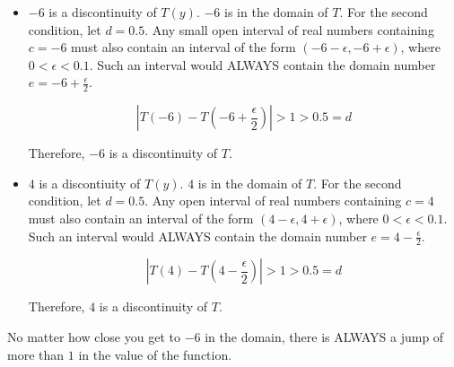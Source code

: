 \documentclass{ximera}
\begin{document}
\begin{example}
\begin{itemize}
\item $-6$ is a discontinuity of $T(y)$.  $-6$ is in the domain of $T$.  For the second condition, let $d = 0.5$. Any small open interval of real numbers containing $c = -6$ must also contain an interval of the form $(-6-\epsilon, -6+\epsilon)$, where $0 < \epsilon < 0.1$.   Such an interval would ALWAYS contain the domain number $e = -6+\frac{\epsilon}{2}$.

\[ \left| T(-6) - T\left(-6+\frac{\epsilon}{2}\right) \right| > 1 > 0.5 = d \]

Therefore, $-6$ is a discontinuity of $T$. \\


\item $4$ is a discontiuity of $T(y)$.   $4$ is in the domain of $T$.  For the second condition, let $d = 0.5$. Any open interval of real numbers containing $c = 4$ must also contain an interval of the form $(4-\epsilon, 4+\epsilon)$, where $0 < \epsilon < 0.1$.   Such an interval would ALWAYS contain the domain number $e = 4-\frac{\epsilon}{2}$.

\[ \left| T(4) - T\left(4-\frac{\epsilon}{2}\right) \right| > 1 > 0.5 = d \]

Therefore, $4$ is a discontinuity of $T$. \\

\end{itemize}



\end{example}

No matter how close you get to $-6$ in the domain, there is ALWAYS a jump of more than $1$ in the value of the function.  \\
\end{document}
